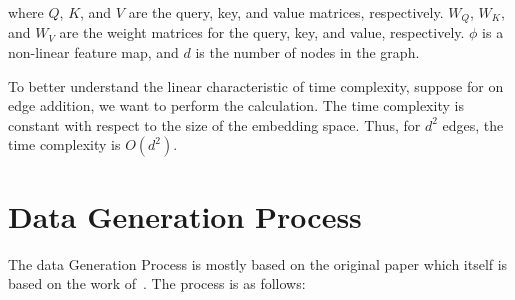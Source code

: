 \documentclass{lxaiproposal}
\begin{document}
    where $Q$, $K$, and $V$ are the query, key, and value matrices, respectively. $W_Q$, $W_K$, and $W_V$ are the
    weight matrices for the query, key, and value, respectively. $\phi$ is a non-linear feature map, and $d$ is the
    number of nodes in the graph.

    To better understand the linear characteristic of time complexity, suppose for on edge addition, we want to
    perform the calculation. The time complexity is constant with respect to the size of the embedding space. Thus,
    for $d^2$ edges, the time complexity is $O(d^2)$.


    \section{Data Generation Process}\label{app:data_generation}
    \vspace*{-3mm}

    The data Generation Process is mostly based on the original paper which itself is based on the work of~\cite{erdos1960evolutionrandomgraphs}.
    The process is as follows:
\end{document}
